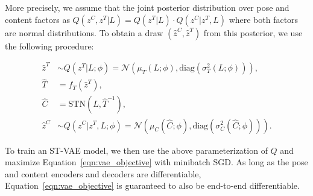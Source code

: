 More precisely, we assume that the joint posterior distribution over
pose and content factors as
$Q(z^C, z^T | L) = Q(z^T |L)\cdot Q(z^C | z^T, L)$ where both factors are normal distributions.  
To obtain a draw $(\hat{z}^C, \hat{z}^T)$ from this posterior, we use the following procedure:

\begin{align*}
\hat{z}^T &\sim Q(z^T |L; \phi) = \mathcal{N}(\mu_{T}(L; \phi), \mbox{diag}(\sigma_{T}^2(L; \phi))), \\
\hat{T} &= f_T(\hat{z}^T), \\
\hat{C} &= \mbox{STN}(L, \hat{T}^{-1}), \\
\hat{z}^C &\sim Q(z^C | z^T, L; \phi) =  \mathcal{N}(\mu_{C}(\hat{C}; \phi), \mbox{diag}(\sigma_{C}^2(\hat{C}; \phi))).
\end{align*}


To train an ST-VAE model, we then use the above parameterization of $Q$ and maximize Equation~\ref{eqn:vae_objective} with minibatch
SGD.
As long as the pose and content encoders and decoders  are differentiable, Equation~\ref{eqn:vae_objective} is guaranteed to also be 
end-to-end differentiable.







